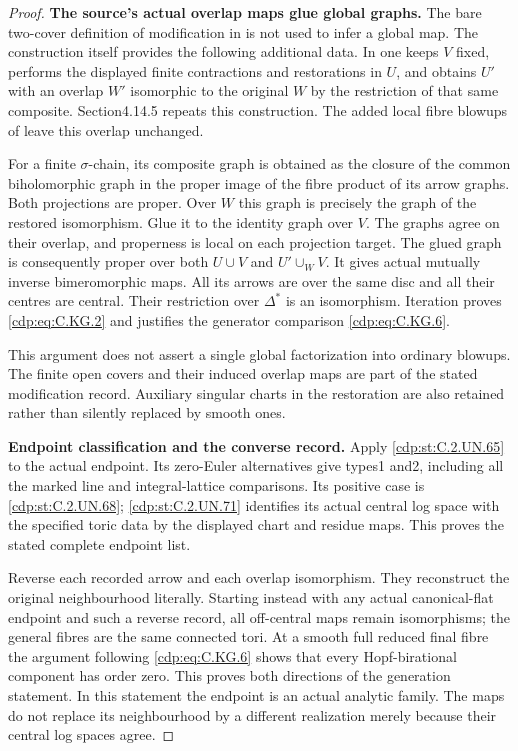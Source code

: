 \begin{proof}
\par\medskip\noindent\textbf{The source's actual overlap maps glue global graphs.}
The bare two-cover definition of modification
in \cite[\S2]{Kulikov1981} is not used to
infer a global map. The construction itself
provides the following additional data.
In \cite[\S4.10.8, pp.980--982]{Kulikov1977}
one keeps $V$ fixed, performs the displayed
finite contractions and restorations in
$U$, and obtains $U'$ with an overlap
$W'$ isomorphic to the original $W$ by
the restriction of that same composite.
Section4.14.5 repeats this construction.
The added local fibre blowups of
\cite[\S8]{Kulikov1981} leave this overlap
unchanged.

For a finite $\sigma$-chain, its composite
graph is obtained as the closure of the
common biholomorphic graph in the proper
image of the fibre product of its arrow
graphs. Both projections are proper.
Over $W$ this graph is precisely the
graph of the restored isomorphism.
Glue it to the identity graph over $V$.
The graphs agree on their overlap, and
properness is local on each projection
target. The glued graph is consequently
proper over both $U\cup V$ and
$U'\cup_W V$. It gives actual mutually
inverse bimeromorphic maps. All its arrows
are over the same disc and all their
centres are central. Their restriction
over $\Delta^*$ is an isomorphism.
Iteration proves \eqref{cdp:eq:C.KG.2} and justifies
the generator comparison \eqref{cdp:eq:C.KG.6}.

This argument does not assert a single
global factorization into ordinary
blowups. The finite open covers and
their induced overlap maps are part
of the stated modification record.
Auxiliary singular charts in the
restoration are also retained rather
than silently replaced by smooth ones.

\par\medskip\noindent\textbf{Endpoint classification and the converse record.}
Apply \ref{cdp:st:C.2.UN.65} to the actual endpoint.
Its zero-Euler alternatives give types1
and2, including all the marked line
and integral-lattice comparisons.
Its positive case is \ref{cdp:st:C.2.UN.68}; \ref{cdp:st:C.2.UN.71}
identifies its actual central log
space with the specified toric data
by the displayed chart and residue
maps. This proves the stated complete
endpoint list.

Reverse each recorded arrow and each
overlap isomorphism. They reconstruct
the original neighbourhood literally.
Starting instead with any actual
canonical-flat endpoint and such a
reverse record, all off-central maps
remain isomorphisms; the general
fibres are the same connected tori.
At a smooth full reduced final fibre
the argument following \eqref{cdp:eq:C.KG.6} shows
that every Hopf-birational component
has order zero. This proves both
directions of the generation statement.
In this statement the endpoint is an
actual analytic family. The maps do
not replace its neighbourhood by a
different realization merely because
their central log spaces agree.


\end{proof}
